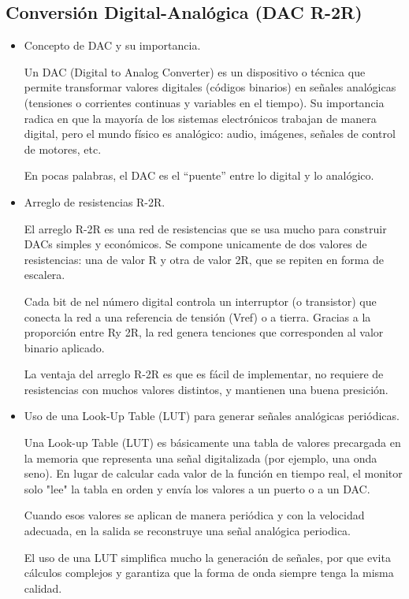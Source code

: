 \subsection{Conversión Digital-Analógica (DAC R-2R)}
\begin{itemize}
    \item Concepto de DAC y su importancia.\vspace{0.5em}
    
    Un DAC (Digital to Analog Converter) es un dispositivo o técnica que permite transformar valores digitales (códigos binarios) en señales analógicas (tensiones o corrientes continuas y variables en el tiempo). Su importancia radica en que la mayoría de los sistemas electrónicos trabajan de manera digital, pero el mundo físico es analógico: audio, imágenes, señales de control de motores, etc.
    
    En pocas palabras, el DAC es el “puente” entre lo digital y lo analógico.\vspace{1em}

    \item Arreglo de resistencias R-2R.\vspace{0.5em}

    El arreglo R-2R es una red de resistencias que se usa mucho para construir DACs simples y económicos. Se compone unicamente de dos valores de resistencias: una de valor R y otra de valor 2R, que se repiten en forma de escalera.
    
    Cada bit de nel número digital controla un interruptor (o transistor) que conecta la red a una referencia de tensión (Vref) o a tierra. Gracias a la proporción entre Ry 2R, la red genera tenciones que corresponden al valor binario aplicado.
    
    La ventaja del arreglo R-2R es que es fácil de implementar, no requiere de resistencias con muchos valores distintos, y mantienen una buena presición.\vspace{1em}
    
    \item Uso de una Look-Up Table (LUT) para generar señales analógicas periódicas.\vspace{0.5em}
    
    Una Look-up Table (LUT) es básicamente una tabla de valores precargada en la memoria que representa una señal digitalizada (por ejemplo, una onda seno). En lugar de calcular cada valor de la función en tiempo real, el monitor solo "lee" la tabla en orden y envía los valores a un puerto o a un DAC.
    
    Cuando esos valores se aplican de manera periódica y con la velocidad adecuada, en la salida se reconstruye una señal analógica periodica.
    
    El uso de una LUT simplifica mucho la generación de señales, por que evita cálculos complejos y garantiza que la forma de onda siempre tenga la misma calidad.\vspace{1em}
\end{itemize}


